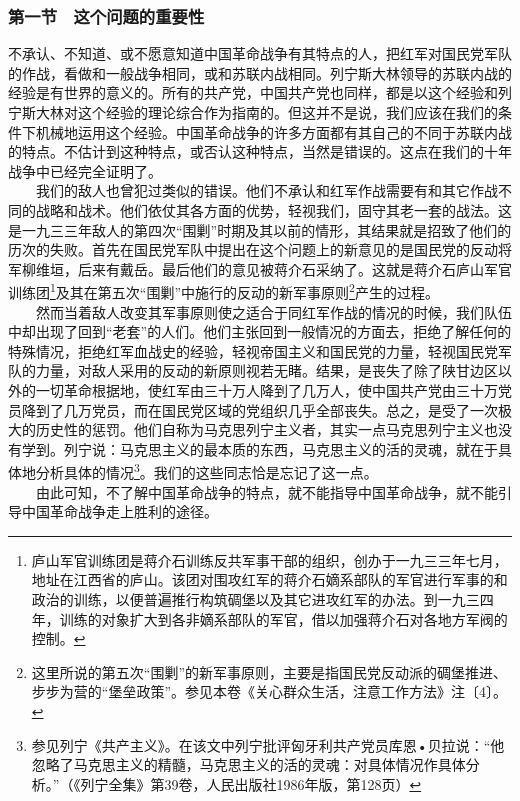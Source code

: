 \documentclass[cn,11pt,chinese]{elegantbook}
\def\myformat#1{\hfil\hfil #1}
\begin{document}
\subsubsection*{\myformat{第一节　这个问题的重要性}}
不承认、不知道、或不愿意知道中国革命战争有其特点的人，把红军对国民党军队的作战，看做和一般战争相同，或和苏联内战相同。列宁斯大林领导的苏联内战的经验是有世界的意义的。所有的共产党，中国共产党也同样，都是以这个经验和列宁斯大林对这个经验的理论综合作为指南的。但这并不是说，我们应该在我们的条件下机械地运用这个经验。中国革命战争的许多方面都有其自己的不同于苏联内战的特点。不估计到这种特点，或否认这种特点，当然是错误的。这点在我们的十年战争中已经完全证明了。\\
　　我们的敌人也曾犯过类似的错误。他们不承认和红军作战需要有和其它作战不同的战略和战术。他们依仗其各方面的优势，轻视我们，固守其老一套的战法。这是一九三三年敌人的第四次“围剿”时期及其以前的情形，其结果就是招致了他们的历次的失败。首先在国民党军队中提出在这个问题上的新意见的是国民党的反动将军柳维垣，后来有戴岳。最后他们的意见被蒋介石采纳了。这就是蒋介石庐山军官训练团\footnote[9]{ 庐山军官训练团是蒋介石训练反共军事干部的组织，创办于一九三三年七月，地址在江西省的庐山。该团对围攻红军的蒋介石嫡系部队的军官进行军事的和政治的训练，以便普遍推行构筑碉堡以及其它进攻红军的办法。到一九三四年，训练的对象扩大到各非嫡系部队的军官，借以加强蒋介石对各地方军阀的控制。}及其在第五次“围剿”中施行的反动的新军事原则\footnote[10]{ 这里所说的第五次“围剿”的新军事原则，主要是指国民党反动派的碉堡推进、步步为营的“堡垒政策”。参见本卷《关心群众生活，注意工作方法》注〔4〕。}产生的过程。\\
　　然而当着敌人改变其军事原则使之适合于同红军作战的情况的时候，我们队伍中却出现了回到“老套”的人们。他们主张回到一般情况的方面去，拒绝了解任何的特殊情况，拒绝红军血战史的经验，轻视帝国主义和国民党的力量，轻视国民党军队的力量，对敌人采用的反动的新原则视若无睹。结果，是丧失了除了陕甘边区以外的一切革命根据地，使红军由三十万人降到了几万人，使中国共产党由三十万党员降到了几万党员，而在国民党区域的党组织几乎全部丧失。总之，是受了一次极大的历史性的惩罚。他们自称为马克思列宁主义者，其实一点马克思列宁主义也没有学到。列宁说：马克思主义的最本质的东西，马克思主义的活的灵魂，就在于具体地分析具体的情况\footnote[11]{ 参见列宁《共产主义》。在该文中列宁批评匈牙利共产党员库恩•贝拉说：“他忽略了马克思主义的精髓，马克思主义的活的灵魂：对具体情况作具体分析。”（《列宁全集》第39卷，人民出版社1986年版，第128页）}。我们的这些同志恰是忘记了这一点。\\
　　由此可知，不了解中国革命战争的特点，就不能指导中国革命战争，就不能引导中国革命战争走上胜利的途径。\\
\end{document}
